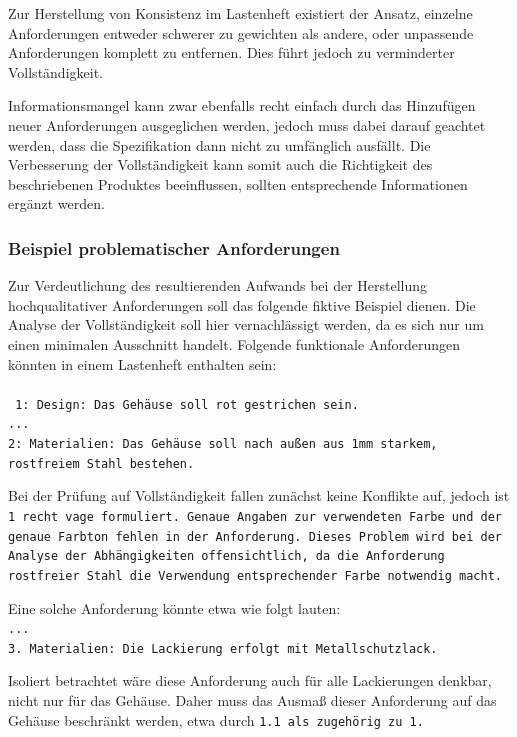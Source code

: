\documentclass[12pt]{report}
\begin{document}
Zur Herstellung von Konsistenz im Lastenheft existiert der Ansatz, einzelne Anforderungen entweder schwerer zu gewichten als andere, oder unpassende Anforderungen komplett zu entfernen. Dies führt jedoch zu verminderter Vollständigkeit. 

Informationsmangel kann zwar ebenfalls recht einfach durch das Hinzufügen neuer Anforderungen ausgeglichen werden, jedoch muss dabei darauf geachtet werden, dass die Spezifikation dann nicht zu umfänglich ausfällt. Die Verbesserung der Vollständigkeit kann somit auch die Richtigkeit des beschriebenen Produktes beeinflussen, sollten entsprechende Informationen ergänzt werden.

\subsubsection{Beispiel problematischer Anforderungen}
Zur Verdeutlichung des resultierenden Aufwands bei der Herstellung hochqualitativer Anforderungen soll das folgende fiktive Beispiel dienen. Die Analyse der Vollständigkeit soll hier vernachlässigt werden, da es sich nur um einen minimalen Ausschnitt handelt. Folgende funktionale Anforderungen könnten in einem Lastenheft enthalten sein:
\\
\\ \tt
1: Design: Das Gehäuse soll rot gestrichen sein.\\
...\\
2: Materialien: Das Gehäuse soll nach außen aus 1mm starkem, \\rostfreiem Stahl bestehen.\\
\rm

Bei der Prüfung auf Vollständigkeit fallen zunächst keine Konflikte auf, jedoch ist \tt 1 \rm recht vage formuliert. Genaue Angaben zur verwendeten Farbe und der genaue Farbton fehlen in der Anforderung. Dieses Problem wird bei der Analyse der Abhängigkeiten offensichtlich, da die Anforderung \glqq rostfreier Stahl\grqq{} die Verwendung entsprechender Farbe notwendig macht. 

Eine solche Anforderung könnte etwa wie folgt lauten:
\\
\tt ...\\
3. Materialien: Die Lackierung erfolgt mit Metallschutzlack.\\
\rm

Isoliert betrachtet wäre diese Anforderung auch für alle Lackierungen denkbar, nicht nur für das Gehäuse. Daher muss das Ausmaß dieser Anforderung auf das Gehäuse beschränkt werden, etwa durch \tt 1.1 \rm als zugehörig zu \tt 1\rm.
\end{document}
